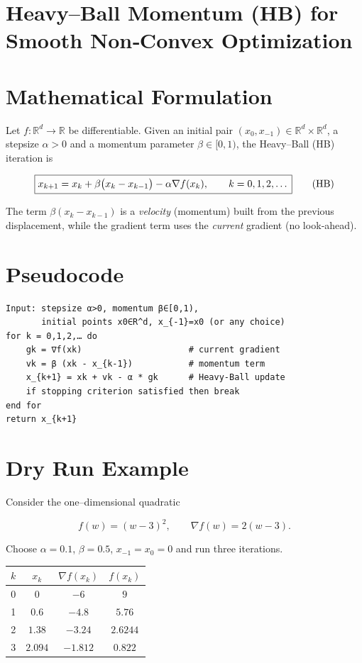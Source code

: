 \documentclass{article}
\begin{document}
\section*{Heavy–Ball Momentum (HB) for Smooth Non‑Convex Optimization}

\section*{Mathematical Formulation}
Let $f:\mathbb{R}^d\rightarrow\mathbb{R}$ be differentiable.  
Given an initial pair $(x_{0},x_{-1})\in\mathbb{R}^d\times\mathbb{R}^d$, a stepsize $\alpha>0$ and a momentum parameter $\beta\in[0,1)$, the Heavy–Ball (HB) iteration is  

\[
\boxed{%
x_{k+1}=x_{k}+ \beta\bigl(x_{k}-x_{k-1}\bigr)-\alpha \nabla f(x_{k}),\qquad k=0,1,2,\dots
}
\tag{HB}
\]

The term $\beta(x_{k}-x_{k-1})$ is a \emph{velocity} (momentum) built from the previous displacement, while the gradient term uses the \emph{current} gradient (no look‑ahead).

\section*{Pseudocode}
\begin{verbatim}
Input: stepsize α>0, momentum β∈[0,1), 
       initial points x0∈R^d, x_{-1}=x0 (or any choice)
for k = 0,1,2,… do
    gk = ∇f(xk)                     # current gradient
    vk = β (xk - x_{k-1})           # momentum term
    x_{k+1} = xk + vk - α * gk      # Heavy‑Ball update
    if stopping criterion satisfied then break
end for
return x_{k+1}
\end{verbatim}

\section*{Dry Run Example}
Consider the one–dimensional quadratic  

\[
f(w)=(w-3)^2,\qquad \nabla f(w)=2(w-3).
\]

Choose $\alpha=0.1$, $\beta=0.5$, $x_{-1}=x_0=0$ and run three iterations.

\begin{center}
\begin{tabular}{c|c|c|c}
$k$ & $x_k$ & $\nabla f(x_k)$ & $f(x_k)$\\\hline
0 & $0$ & $-6$ & $9$\\
1 & $0.6$ & $-4.8$ & $5.76$\\
2 & $1.38$ & $-3.24$ & $2.6244$\\
3 & $2.094$ & $-1.812$ & $0.822$\\
\end{tabular}
\end{center}
\end{document}

